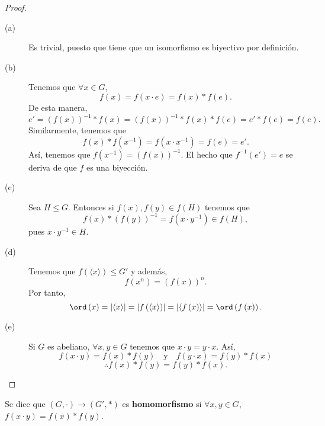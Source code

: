 \begin{proof}
\begin{description}
\item[(a)] Es trivial, puesto que tiene que un isomorfismo es biyectivo por definición.
\item[(b)] Tenemos que $\displaystyle \forall x \in G $, 
	\[f\left(x\right) = f\left(x \cdot e\right) = f\left(x\right) * f\left(e\right) .\]
De esta manera, 
\[e' = \left(f\left(x\right)\right)^{-1}*f\left(x\right) = \left(f\left(x\right)\right)^{-1}*f\left(x\right)*f\left(e\right) = e'*f\left(e\right) = f\left(e\right) .\]
Similarmente, tenemos que 
\[f\left(x\right)*f\left(x^{-1}\right) = f\left(x \cdot x^{-1}\right) = f\left(e\right) = e' .\]
Así, tenemos que $\displaystyle f\left(x^{-1}\right) = \left(f\left(x\right)\right)^{-1} $. El hecho que $\displaystyle f^{-1}\left(e'\right)=e $ se deriva de que $\displaystyle f $ es una biyección.
\item[(c)] Sea $\displaystyle H \leq G $. Entonces si $\displaystyle f\left(x\right), f\left(y\right) \in f\left(H\right) $ tenemos que 
	\[f\left(x\right) * \left(f\left(y\right)\right)^{-1} = f\left(x \cdot y^{-1}\right) \in f\left(H\right) ,\]
	pues $\displaystyle x \cdot y^{-1} \in H $.
\item[(d)] Tenemos que $\displaystyle f\left(\langle x \rangle\right) \leq G'$ y además, 
	\[f\left(x^{n}\right) = \left(f\left(x\right)\right)^{n} .\]
Por tanto, 
\[\ord\left(x\right) = \left|\langle x \rangle \right| = \left|f\left(\langle x \rangle\right)\right| = \left|\langle f\left(x\right)\rangle \right| = \ord\left(f\left(x\right)\right) .\]
\item[(e)] Si $\displaystyle G $ es abeliano, $\displaystyle \forall x,y \in G $ tenemos que $\displaystyle x \cdot y = y \cdot x$. Así,
	\[f\left(x \cdot y\right) = f\left(x\right) * f\left(y\right) \quad \text{y} \quad f\left(y \cdot x\right) = f\left(y\right) * f\left(x\right)\]
\[\therefore f\left(x\right) * f\left(y\right) = f\left(y\right) * f\left(x\right) .\]	
\end{description}
\end{proof}

\begin{fdefinition}[Homomorfismo]
\normalfont Se dice que $\displaystyle \left(G, \cdot \right) \to \left(G', *\right) $ es \textbf{homomorfismo} si $\displaystyle \forall x,y \in G $, $\displaystyle f\left(x \cdot y\right) = f\left(x\right) * f\left(y\right) $.
\end{fdefinition}

